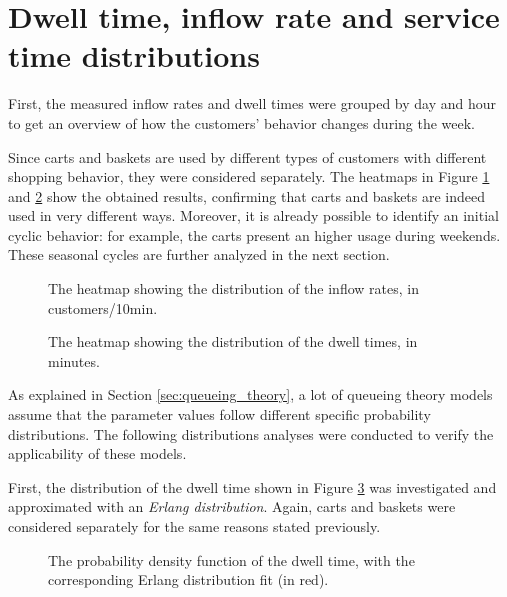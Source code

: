 \section{Dwell time, inflow rate and service time distributions}
\label{sec:dwell_time_inflow_rate_service_time_distributions}

First, the measured inflow rates and dwell times were grouped by day and hour to get an overview of how the customers’ behavior changes during the week.

Since carts and baskets are used by different types of customers with different shopping behavior, they were considered separately. The heatmaps in Figure \ref{fig:inflow_rate_heatmap} and \ref{fig:dwell_time_heatmap} show the obtained results, confirming that carts and baskets are indeed used in very different ways. Moreover, it is already possible to identify an initial cyclic behavior: for example, the carts present an higher usage during weekends. These seasonal cycles are further analyzed in the next section.

\begin{figure}
  \begin{center}
  \end{center}
  \caption{The heatmap showing the distribution of the inflow rates, in customers/10min.}
  \label{fig:inflow_rate_heatmap}
\end{figure}

\begin{figure}
  \begin{center}
  \end{center}
  \caption{The heatmap showing the distribution of the dwell times, in minutes.}
  \label{fig:dwell_time_heatmap}
\end{figure}

As explained in Section \ref{sec:queueing_theory}, a lot of queueing theory models assume that the parameter values follow different specific probability distributions. The following distributions analyses were conducted to verify the applicability of these models.

First, the distribution of the dwell time shown in Figure \ref{fig:dwell_time_distribution} was investigated and approximated with an \emph{Erlang distribution}. Again, carts and baskets were considered separately for the same reasons stated previously.

\begin{figure}
  \begin{center}
  \end{center}
  \caption{The probability density function of the dwell time, with the corresponding Erlang distribution fit (in red).}
  \label{fig:dwell_time_distribution}
\end{figure}

